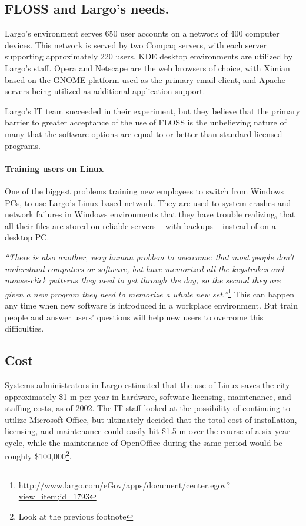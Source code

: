 \subsection{FLOSS and Largo’s needs.}

 Largo’s environment serves 650 user accounts on a network of 400 computer devices. This network is served by two Compaq servers, with each server supporting approximately 220 users. KDE desktop environments are utilized by Largo’s staff. Opera and Netscape are the web browsers of choice, with Ximian based on the GNOME platform used as the primary email client, and Apache servers being utilized as additional application support.
 
  Largo’s IT team succeeded in their experiment, but they believe that the primary barrier to greater acceptance of the use of FLOSS is the unbelieving nature of many that the software options are equal to or better than standard licensed programs.

\paragraph{Training users on Linux}
One of the biggest problems training new employees to switch from Windows PCs, to use Largo's Linux-based network. 
They are used to system crashes and network failures in Windows environments that they have trouble realizing, that all their files are stored on reliable servers -- with backups -- instead of on a desktop PC.

\textit{``There is also another, very human problem to overcome: that most people don't understand computers or software, but have memorized all the keystrokes and mouse-click patterns they need to get through the day, so the second they are given a new program they need to memorize a whole new set.''}\footnote{\url{http://www.largo.com/eGov/apps/document/center.egov?view=item;id=1793}} This can happen any time when new software is introduced in a workplace environment. But train people and answer users' questions will help new users to overcome this difficulties.

\subsection{Cost}
Systems administrators in Largo estimated that the use of Linux saves the city approximately \$1 m per year in hardware, software licensing, maintenance, and staffing costs, as of 2002. The IT staff looked at the possibility of continuing to utilize Microsoft Office, but ultimately decided that the total cost of installation, licensing, and maintenance could easily hit \$1.5 m over the course of a six year cycle, while the maintenance of OpenOffice during the same period would be roughly \$100,000\footnote{Look at the previous footnote}.

